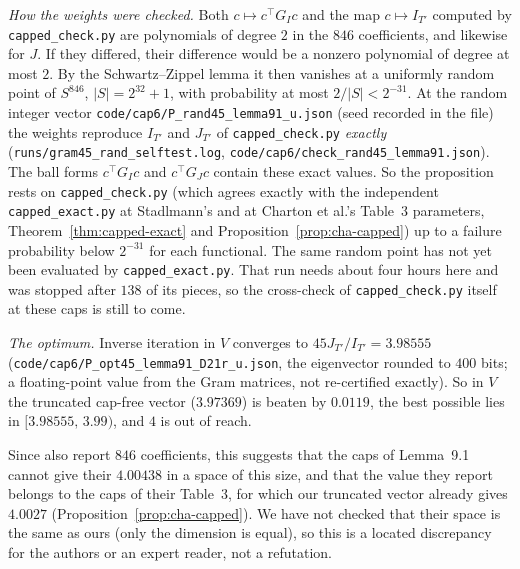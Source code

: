 \documentclass[11pt]{amsart}
\theoremstyle{definition}
\theoremstyle{remark}
\begin{document}
\emph{How the weights were checked.} Both $c\mapsto c^{\top}G_Ic$ and the map
$c\mapsto I_{T'}$ computed by \texttt{capped\_check.py} are polynomials of
degree $2$ in the $846$ coefficients, and likewise for $J$. If they differed,
their difference would be a nonzero polynomial of degree at most $2$. By the
Schwartz--Zippel lemma it then vanishes at a uniformly random point of
$S^{846}$, $|S|=2^{32}+1$, with probability at most $2/|S|<2^{-31}$. At the
random integer vector \texttt{code/cap6/P\_rand45\_lemma91\_u.json} (seed
recorded in the file) the weights reproduce $I_{T'}$ and $J_{T'}$ of
\texttt{capped\_check.py} \emph{exactly}
(\texttt{runs/gram45\_rand\_selftest.log}, \texttt{code/cap6/check\_rand45\_lemma91.json}).
The ball forms $c^{\top}G_Ic$ and $c^{\top}G_Jc$ contain these exact
values. So the proposition rests on \texttt{capped\_check.py} (which agrees
exactly with the independent \texttt{capped\_exact.py} at Stadlmann's and at
Charton et al.'s Table~3 parameters, Theorem~\ref{thm:capped-exact} and
Proposition~\ref{prop:cha-capped}) up to a failure probability below
$2^{-31}$ for each functional. The same random point has not yet been
evaluated by \texttt{capped\_exact.py}. That run needs about four hours here
and was stopped after $138$ of its pieces, so the cross-check of
\texttt{capped\_check.py} itself at these caps is still to come.

\begin{sloppypar}
\emph{The optimum.} Inverse iteration in $V$ converges to
$45J_{T'}/I_{T'}=3.98555$ (\texttt{code/cap6/}\allowbreak\texttt{P\_opt45\_lemma91\_D21r\_u.json},
the eigenvector rounded to $400$ bits; a floating-point value from the Gram
matrices, not re-certified exactly). So in $V$ the truncated cap-free vector
($3.97369$) is beaten by $0.0119$, the best possible lies in
$[3.98555,\,3.99)$, and $4$ is out of reach.
\end{sloppypar}

Since \cite{Cha26} also report $846$ coefficients, this suggests that the
caps of Lemma~9.1 cannot give their $4.00438$ in a space of this size, and
that the value they report belongs to the caps of their Table~3, for which our
truncated vector already gives $4.0027$
(Proposition~\ref{prop:cha-capped}). We have not checked that their space
is the same as ours (only the dimension is equal), so this is a located
discrepancy for the authors or an expert reader, not a refutation.
\end{document}

